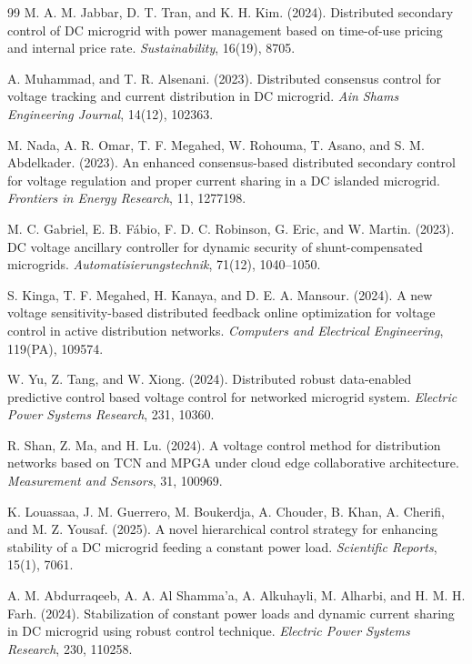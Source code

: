 \documentclass[]{interact}
\theoremstyle{plain}%
\theoremstyle{definition}
\theoremstyle{remark}
\begin{document}
\begin{thebibliography}{99}
M. A. M. Jabbar, D. T. Tran, and K. H. Kim. (2024). Distributed secondary control of DC microgrid with power management based on time-of-use pricing and internal price rate. \emph{Sustainability}, 16(19), 8705.

A. Muhammad, and T. R. Alsenani. (2023). Distributed consensus control for voltage tracking and current distribution in DC microgrid. \emph{Ain Shams Engineering Journal}, 14(12), 102363.

M. Nada, A. R. Omar, T. F. Megahed, W. Rohouma, T. Asano, and S. M. Abdelkader. (2023). An enhanced consensus-based distributed secondary control for voltage regulation and proper current sharing in a DC islanded microgrid. \emph{Frontiers in Energy Research}, 11, 1277198.

M. C. Gabriel, E. B. Fábio, F. D. C. Robinson, G. Eric, and W. Martin. (2023). DC voltage ancillary controller for dynamic security of shunt-compensated microgrids. \emph{Automatisierungstechnik}, 71(12), 1040–1050.

S. Kinga, T. F. Megahed, H. Kanaya, and D. E. A. Mansour. (2024). A new voltage sensitivity-based distributed feedback online optimization for voltage control in active distribution networks. \emph{Computers and Electrical Engineering}, 119(PA), 109574.

W. Yu, Z. Tang, and W. Xiong. (2024). Distributed robust data-enabled predictive control based voltage control for networked microgrid system. \emph{Electric Power Systems Research}, 231, 10360.

R. Shan, Z. Ma, and H. Lu. (2024). A voltage control method for distribution networks based on TCN and MPGA under cloud edge collaborative architecture. \emph{Measurement and Sensors}, 31, 100969.

K. Louassaa, J. M. Guerrero, M. Boukerdja, A. Chouder, B. Khan, A. Cherifi, and M. Z. Yousaf. (2025). A novel hierarchical control strategy for enhancing stability of a DC microgrid feeding a constant power load. \emph{Scientific Reports}, 15(1), 7061.

A. M. Abdurraqeeb, A. A. Al Shamma'a, A. Alkuhayli, M. Alharbi, and H. M. H. Farh. (2024). Stabilization of constant power loads and dynamic current sharing in DC microgrid using robust control technique. \emph{Electric Power Systems Research}, 230, 110258.


\end{thebibliography}
\end{document}
